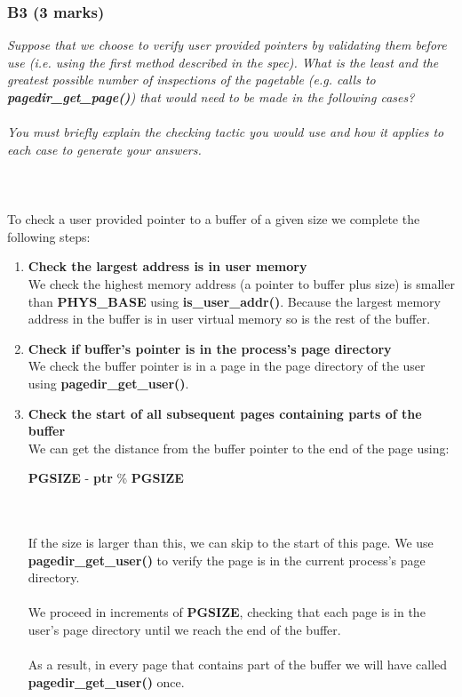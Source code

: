 \documentclass{report}
\newcommand{\question}[1]{\textit{#1} \ }
\newcommand{\bullpara}[2]{\item \textbf{#1} \ #2}
\newcommand{\fun}[1]{\textcolor{Emerald}{\textbf{#1}}}
\newcommand{\var}[1]{\textcolor{RoyalPurple}{\textbf{#1}}}
\newcommand{\const}[1]{\textcolor{BrickRed}{\textbf{#1}}}
\begin{document}
            \subsubsection*{B3 (3 marks)}
                \question{Suppose that we choose to verify user provided pointers by validating them before use (i.e. using the first method
                described in the spec). What is the least and the greatest possible number of inspections of the pagetable (e.g. calls to 
                \fun{pagedir\_get\_page()}) that would need to be made in the following cases?
                \\
                \\ You must briefly explain the checking tactic you would use and how it applies to each case to generate your answers.}
                \\ \\ \\
                \\To check a user provided pointer to a buffer of a given size we complete the following steps:
                \begin{enumerate}
                    \bullpara{Check the largest address is in user memory}{
                        \\ We check the highest memory address (a pointer to buffer plus size) is smaller than \const{PHYS\_BASE}
												using \fun{is\_user\_addr()}. Because the largest memory address in the buffer is in user virtual memory so is the rest of the buffer.
                    }
                    \bullpara{Check if buffer's pointer is in the process's page directory}{
                        \\ We check the buffer pointer is in a page in the page directory of the user using \fun{pagedir\_get\_user()}.
                    }
                    \bullpara{Check the start of all subsequent pages containing parts of the buffer}{
                        \\ We can get the distance from the buffer pointer to the end of the page using:
                        \\ \centerline{\const{PGSIZE} - \var{ptr} \% \const{PGSIZE}}
                        \\
                        \\ If the size is larger than this, we can skip to the start of this page. We use \fun{pagedir\_get\_user()} 
												to verify the page is in the current process's page directory.
                        \\
                        \\ We proceed in increments of \const{PGSIZE}, checking that each page is in the user's page directory until we reach the end of the buffer.
                        \\
                        \\ As a result, in every page that contains part of the buffer we will have called \fun{pagedir\_get\_user()} once.
                    }
                \end{enumerate}
\end{document}
